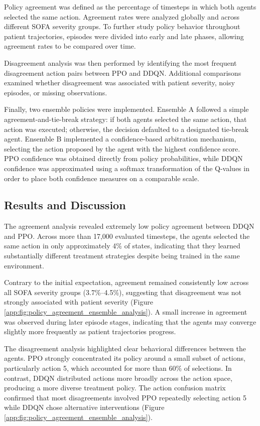 \documentclass[11pt,a4paper]{article}
\begin{document}
Policy agreement was defined as the percentage of timesteps in which both agents selected the same action. 
Agreement rates were analyzed globally and across different SOFA severity groups. 
To further study policy behavior throughout patient trajectories, 
episodes were divided into early and late phases, allowing agreement rates to be compared over time.

Disagreement analysis was then performed by identifying the most frequent disagreement 
action pairs between PPO and DDQN. 
Additional comparisons examined whether disagreement was associated with patient severity, 
noisy episodes, or missing observations.

Finally, two ensemble policies were implemented. 
Ensemble A followed a simple agreement-and-tie-break strategy: if both agents selected the same action, 
that action was executed; otherwise, the decision defaulted to a designated tie-break agent. 
Ensemble B implemented a confidence-based arbitration mechanism, selecting the action proposed by the agent with the highest confidence score. 
PPO confidence was obtained directly from policy probabilities, while DDQN confidence was approximated using a softmax transformation 
of the Q-values in order to place both confidence measures on a comparable scale.

\subsection{Results and Discussion}
The agreement analysis revealed extremely low policy agreement between DDQN and PPO. 
Across more than 17,000 evaluated timesteps, the agents selected the same action in only approximately 4\% of states, 
indicating that they learned substantially different treatment strategies despite being trained in the same environment.

Contrary to the initial expectation, agreement remained consistently low across all SOFA severity groups (3.7\%–4.5\%),
suggesting that disagreement was not strongly associated with patient severity (Figure \ref{app:fig:policy_agreement_ensemble_analysis}).
A small increase in agreement was observed during later episode stages, 
indicating that the agents may converge slightly more frequently as patient trajectories progress.

The disagreement analysis highlighted clear behavioral differences between the agents. 
PPO strongly concentrated its policy around a small subset of actions, particularly action 5, 
which accounted for more than 60\% of selections. 
In contrast, DDQN distributed actions more broadly across the action space, producing a more diverse treatment policy. 
The action confusion matrix confirmed that most disagreements involved PPO repeatedly selecting action 5 
while DDQN chose alternative interventions (Figure \ref{app:fig:policy_agreement_ensemble_analysis}).
\end{document}
